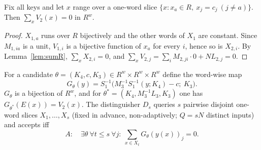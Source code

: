 \begin{lemma}\label{lem:V2}
Fix all keys and let $x$ range over a one-word slice $\{x: x_{a}\in R,\ x_j=c_j\ (j\ne a)\}$. Then
$\sum_xV_2(x)=0$ in $R^w$.
\end{lemma}
\begin{proof}
$X_{1,a}$ runs over $R$ bijectively and the other words of $X_1$ are constant. Since $M_{1,ia}$ is a unit,
$V_{1,i}$ is a bijective function of $x_a$ for every $i$, hence so is $X_{2,i}$. By Lemma~\ref{lem:sumR},
$\sum_xX_{2,i}=0$, and $\sum_xV_{2,j}=\sum_iM_{2,ji}\cdot0+N L_{2,j}=0$.
\end{proof}

For a candidate $\theta=(K_4,c,K_3)\in R^w\times R^w\times R^w$ define the word-wise map
\[
G_\theta(y)=S_1^{-1}\bigl(M_3^{-1}S_1^{-1}(y;K_4)-c;\ K_3\bigr).
\]
$G_\theta$ is a bijection of $R^w$, and for $\theta^*=(K_4,M_3^{-1}L_3,K_3)$ one has $G_{\theta^*}(E(x))=V_2(x)$.
The distinguisher $D_s$ queries $s$ pairwise disjoint one-word slices $X_1,\dots,X_s$ (fixed in advance,
non-adaptively; $Q=sN$ distinct inputs) and accepts iff
\[
A:\quad \exists\theta\ \forall t\le s\ \forall j:\ \textstyle\sum_{x\in X_t}G_\theta(y(x))_j=0 .
\]

